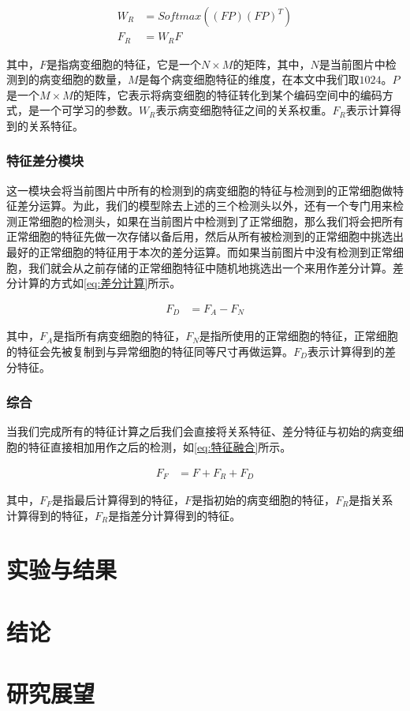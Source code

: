 \begin{equation}
    \begin{aligned}
        W_R&=Softmax((FP)(FP)^T)\\
        F_R&=W_RF
    \end{aligned}
    \label{eq:关系计算}
\end{equation}

\par 其中，$F$是指病变细胞的特征，它是一个$N\times M$的矩阵，其中，$N$是当前图片中检测到的病变细胞的数量，$M$是每个病变细胞特征的维度，在本文中我们取$1024$。$P$是一个$M\times M$的矩阵，它表示将病变细胞的特征转化到某个编码空间中的编码方式，是一个可学习的参数。$W_R$表示病变细胞特征之间的关系权重。$F_R$表示计算得到的关系特征。
\subsubsection{特征差分模块}
\par 这一模块会将当前图片中所有的检测到的病变细胞的特征与检测到的正常细胞做特征差分运算。为此，我们的模型除去上述的三个检测头以外，还有一个专门用来检测正常细胞的检测头，如果在当前图片中检测到了正常细胞，那么我们将会把所有正常细胞的特征先做一次存储以备后用，然后从所有被检测到的正常细胞中挑选出最好的正常细胞的特征用于本次的差分运算。而如果当前图片中没有检测到正常细胞，我们就会从之前存储的正常细胞特征中随机地挑选出一个来用作差分计算。差分计算的方式如\ref{eq:差分计算}所示。

\begin{equation}
    \begin{aligned}
        F_D&=F_A-F_N
    \end{aligned}
    \label{eq:差分计算}
\end{equation}

\par 其中，$F_A$是指所有病变细胞的特征，$F_N$是指所使用的正常细胞的特征，正常细胞的特征会先被复制到与异常细胞的特征同等尺寸再做运算。$F_D$表示计算得到的差分特征。

\subsubsection{综合}
\par 当我们完成所有的特征计算之后我们会直接将关系特征、差分特征与初始的病变细胞的特征直接相加用作之后的检测，如\ref{eq:特征融合}所示。

\begin{equation}
    \begin{aligned}
        F_F&=F+F_R+F_D
    \end{aligned}
    \label{eq:特征融合}
\end{equation}

\par 其中，$F_F$是指最后计算得到的特征，$F$是指初始的病变细胞的特征，$F_R$是指关系计算得到的特征，$F_R$是指差分计算得到的特征。

\section{实验与结果}

\section{结论}

\section{研究展望}
